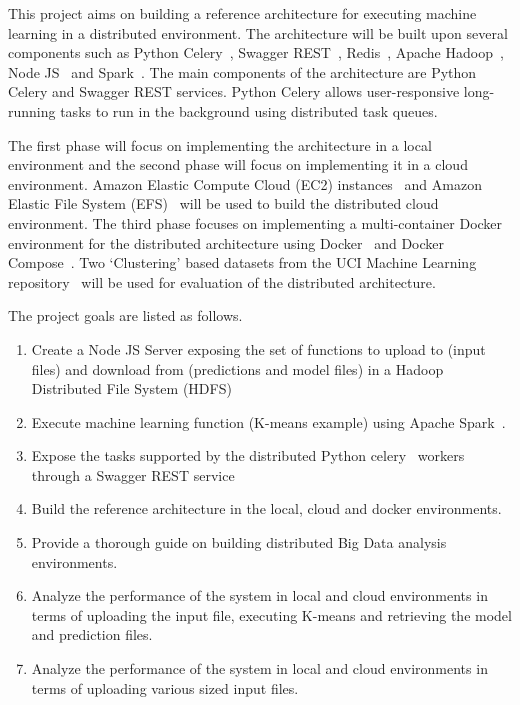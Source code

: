 This project aims on building a reference architecture for executing 
machine learning in a distributed environment. The architecture will be built 
upon several components such as Python 
Celery~\cite{hid-sp18-416-www-python-celery}, Swagger 
REST~\cite{hid-sp18-416-www-swagger}, Redis~\cite{hid-sp18-416-www-redis}, 
Apache Hadoop~\cite{hid-sp18-416-www-apache-hadoop}, 
Node JS~\cite{hid-sp18-416-www-nodejs} and 
Spark~\cite{hid-sp18-416-www-apache-spark}. The main components of the 
architecture are Python Celery and Swagger REST services. Python Celery allows 
user-responsive long-running tasks to run in the background using distributed 
task queues. 

The first phase will focus on implementing the architecture in a local 
environment and the second phase will focus on implementing it in a cloud 
environment. Amazon Elastic Compute Cloud (EC2) 
instances~\cite{hid-sp18-416-www-amazon-ec2} and 
Amazon Elastic File System (EFS)~\cite{hid-sp18-416-www-amazon-efs} will be 
used to build the distributed cloud environment. The third 
phase focuses on implementing a multi-container Docker environment for the 
distributed architecture using Docker~\cite{hid-sp18-416-www-docker} and 
Docker Compose~\cite{hid-sp18-416-www-docker-compose}. Two `Clustering' based 
datasets from the UCI Machine Learning 
repository~\cite{hid-sp18-416-www-uci-ml-repository} will be used for 
evaluation of the distributed architecture. 

The project goals are listed as follows.
\begin{enumerate}
	\item Create a Node JS Server exposing the set of functions to upload 
	to (input files) and download from (predictions and model files) in a 
	Hadoop Distributed File System (HDFS)~\cite{hid-sp18-416-www-ibm-hdfs}
	\item Execute machine learning function (K-means example) using Apache 
	Spark~\cite{hid-sp18-416-www-apache-spark}.
	\item Expose the tasks supported by the distributed Python 
	celery~\cite{hid-sp18-416-www-python-celery} workers through a Swagger REST 
	service~\cite{hid-sp18-416-www-swagger}
	\item Build the reference architecture in the local, cloud and docker 
	environments.
	\item Provide a thorough guide on building distributed Big Data analysis 
	environments.	
	\item Analyze the performance of the system in local and cloud environments 
	in terms of uploading the input file, executing K-means and retrieving the 
	model and prediction files.
	\item Analyze the performance of the system in local and cloud environments 
	in terms of uploading various sized input files.
\end{enumerate}


